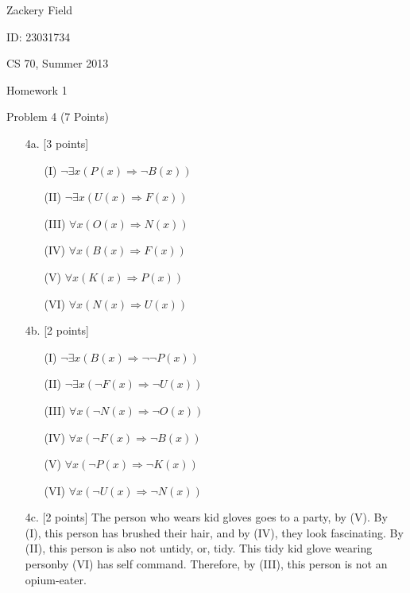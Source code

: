 \documentclass[11pt,letterpaper]{article}
\begin{document}
Zackery Field

ID: 23031734

CS 70, Summer 2013

Homework 1 

Problem 4 (7 Points)
\bigskip

\begin{enumerate}
\item[4a.] [3 points]
	\begin{enumerate}
	\item[(I)] $\neg \exists x (P(x) \Rightarrow \neg B(x)) $
	\item[(II)] $\neg \exists x (U(x) \Rightarrow F(x)) $
	\item[(III)] $\forall x (O(x) \Rightarrow N(x)) $
	\item[(IV)] $ \forall x (B(x) \Rightarrow F(x)) $
	\item[(V)] $ \forall x (K(x) \Rightarrow P(x)) $
	\item[(VI)] $ \forall x (N(x) \Rightarrow U(x)) $
	\end{enumerate}


\bigskip
\item[4b.][2 points]
	\begin{enumerate}
	\item[(I)] $\neg \exists x (B(x) \Rightarrow \neg \neg P(x)) $
	\item[(II)] $\neg \exists x (\neg F(x) \Rightarrow \neg U(x)) $
	\item[(III)] $\forall x (\neg N(x) \Rightarrow \neg O(x)) $
	\item[(IV)] $ \forall x (\neg F(x) \Rightarrow  \neg B(x)) $
	\item[(V)] $ \forall x (\neg P(x) \Rightarrow \neg K(x)) $
	\item[(VI)] $ \forall x (\neg U(x) \Rightarrow \neg N(x)) $
	\end{enumerate}


\bigskip
\item[4c.] [2 points]
The person who wears kid gloves goes to a party, by (V). By (I), this person has brushed their hair, and by (IV), they look fascinating. By (II), this person is also not untidy, or, tidy. This tidy kid glove wearing personby (VI) has self command. Therefore, by (III), this person is not an opium-eater.

\end{enumerate}
\end{document}
